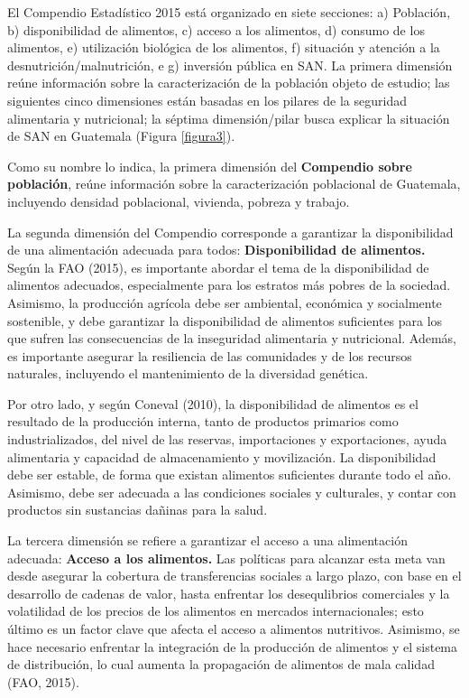 
\newpage




El Compendio Estadístico 2015 está organizado en siete secciones: a) Población, b) disponibilidad de alimentos, c) acceso a los alimentos, d) consumo de los alimentos, e) utilización biológica de los alimentos, f) situación y atención a la desnutrición/malnutrición, e g) inversión pública en SAN. La primera dimensión reúne información sobre la caracterización de la población objeto de estudio; las siguientes cinco  dimensiones están basadas en los pilares de la seguridad alimentaria y nutricional; la séptima dimensión/pilar busca explicar la situación de SAN en Guatemala (Figura \ref{figura3}). 

Como su nombre lo indica, la primera dimensión del \textbf{Compendio sobre población}, reúne información sobre la caracterización poblacional de Guatemala, incluyendo densidad poblacional, vivienda, pobreza y trabajo. 



La segunda dimensión del Compendio corresponde a garantizar la disponibilidad de una alimentación adecuada para todos:\textbf{ Disponibilidad de alimentos. }Según la FAO (2015), es importante abordar el tema de la disponibilidad de alimentos adecuados, especialmente para los estratos más pobres de la sociedad. Asimismo, la producción agrícola debe ser ambiental, económica y socialmente sostenible, y debe garantizar la disponibilidad de alimentos suficientes para los que sufren las consecuencias de la inseguridad alimentaria y nutricional. Además, es importante asegurar la resiliencia de las comunidades y de los recursos naturales, incluyendo el mantenimiento de la diversidad genética.

Por otro lado, y según Coneval (2010), la disponibilidad de alimentos es el resultado de la producción interna, tanto de productos primarios como industrializados, del nivel de las reservas, importaciones y exportaciones, ayuda alimentaria y capacidad de almacenamiento y movilización. La disponibilidad debe ser estable, de forma que existan alimentos suficientes durante todo el año. Asimismo, debe ser adecuada a las condiciones sociales y culturales, y contar con productos sin sustancias dañinas para la salud.

La tercera dimensión se refiere a garantizar el acceso a una alimentación adecuada: \textbf{Acceso a los alimentos.} Las políticas para alcanzar esta meta van desde asegurar la cobertura de transferencias sociales a largo plazo, con base en el desarrollo de cadenas de valor, hasta enfrentar los desequlibrios comerciales y la volatilidad de los precios de los alimentos en mercados internacionales; esto último es un factor clave que afecta el acceso a alimentos nutritivos. Asimismo, se hace necesario enfrentar la integración de la producción de alimentos y el sistema de distribución, lo cual aumenta la propagación de alimentos de mala calidad (FAO, 2015).

